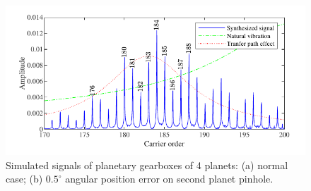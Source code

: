 \documentclass[a4paper,fleqn]{cas-sc}%
\begin{document}
\begin{figure}[pos=htbp]
    \hspace*{1.5em}\includegraphics[scale=\myscale,valign=t]{Freq_p4_fault.pdf}
    \caption{Simulated signals of planetary gearboxes of 4 planets: (a) normal case; (b) $0.5^\circ$ angular position error on second planet pinhole.}
    \label{fig:simulated_p4}
\end{figure}
\end{document}
